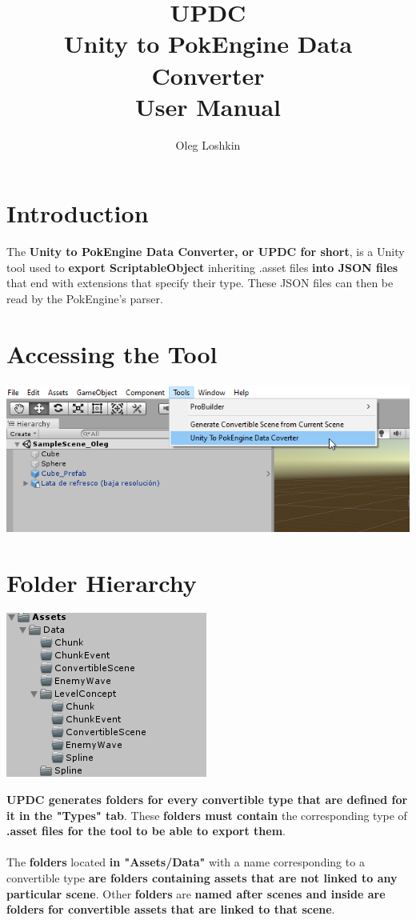 \documentclass[10pt,a4paper]{article}
\author{Oleg Loshkin}
\title{\textbf{UPDC}\\Unity to PokEngine Data Converter\\\textbf{User Manual}}
\begin{document}
\maketitle
\section{Introduction}
The \textbf{Unity to PokEngine Data Converter, or UPDC for short}, is a Unity tool used to \textbf{export ScriptableObject} inheriting .asset files \textbf{into JSON files} that end with extensions that specify their type. These JSON files can then be read by the PokEngine's parser.

\section{Accessing the Tool}
\begin{center}
\includegraphics[scale=1.0]{mainMenu}
\end{center}

\section{Folder Hierarchy}
\begin{center}
\includegraphics[scale=1.0]{dataFolder}
\end{center}
\textbf{UPDC generates folders for every convertible type that are defined for it in the "Types" tab}. These \textbf{folders must contain} the corresponding type of \textbf{.asset files for the tool to be able to export them}.\\\\
The \textbf{folders} located \textbf{in "Assets/Data"} with a name corresponding to a convertible type \textbf{are folders containing assets that are not linked to any particular scene}. Other \textbf{folders} are \textbf{named after scenes and inside are folders for convertible assets that are linked to that scene}.
\end{document}
